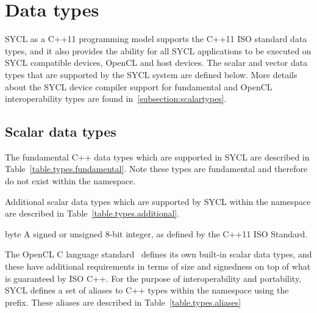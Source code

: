 \section{Data types}

SYCL as a C++11 programming model supports the C++11 ISO standard data types,
and it also provides the ability for all SYCL applications to be executed on SYCL
compatible devices, OpenCL and host devices. The scalar and vector data types that
are supported by the SYCL system are defined below. More details about the SYCL
device compiler support for fundamental and OpenCL interoperability types are found
in~\ref{subsection:scalartypes}.

\subsection{Scalar data types}

The fundamental C++ data types which are supported in SYCL are described in
Table~\ref{table.types.fundamental}. Note these types are fundamental and therefore
do not exist within the  namespace.

Additional scalar data types which are supported by SYCL within the  namespace are described in Table~\ref{table.types.additional}.

\addRow
{
  byte
}
{
  A signed or unsigned 8-bit integer, as defined by the C++11 ISO Standard.
}
\completeTable

The OpenCL C language standard~\cite[\S 6.11]{opencl12} defines its own built-in
scalar data types, and these have additional requirements in terms of size and
signedness on top of what is guaranteed by ISO C++. For the purpose of interoperability and portability, SYCL defines a set of aliases to C++ types
within the  namespace using the  prefix.
These aliases are described in Table~\ref{table.types.aliases}


